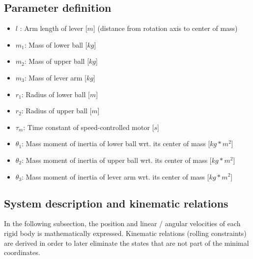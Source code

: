 \documentclass{article}
\begin{document}
\subsection{Parameter definition}
\begin{itemize}
	\item $l$ : Arm length of lever [$m$] (distance from rotation axis to center of mass)
	\item $m_1$: Mass of lower ball [$kg$]
	\item $m_2$: Mass of upper ball [$kg$]
	\item $m_3$: Mass of lever arm [$kg$]
	\item $r_1$: Radius of lower ball [$m$]
	\item $r_2$: Radius of upper ball [$m$]
	\item $\tau_m$: Time constant of speed-controlled motor [$s$]
	\item $\theta_1$: Mass moment of inertia of lower ball wrt. its center of mass [$kg*m^2$]
	\item $\theta_2$: Mass moment of inertia of upper ball wrt. its center of mass [$kg*m^2$]
	\item $\theta_3$: Mass moment of inertia of lever arm wrt. its center of mass [$kg*m^2$]
	\end{itemize}

\subsection{System description and kinematic relations}
In the following subsection, the position and linear / angular velocities of each rigid body is mathematically expressed. Kinematic relations (rolling constraints) are derived in order to later eliminate the states that are not part of the minimal coordinates.
\end{document}
